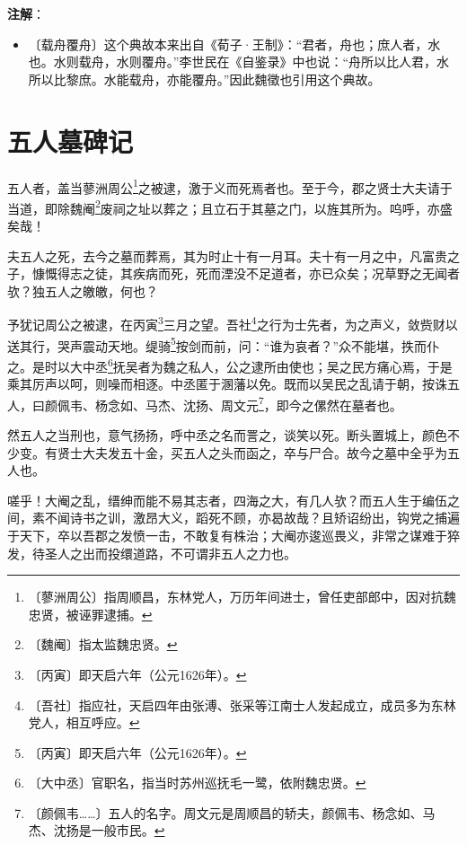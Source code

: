 \documentclass[12pt,UTF-8,openany]{ctexbook}
\begin{document}
\textbf{注解}：

\vspace{-1em}

\begin{itemize}
    \setlength\itemsep{-0.2em}
    \item〔载舟覆舟〕这个典故本来出自《荀子·王制》：“君者，舟也；庶人者，水也。水则载舟，水则覆舟。”李世民在《自鉴录》中也说：“舟所以比人君，水所以比黎庶。水能载舟，亦能覆舟。”因此魏徵也引用这个典故。
\end{itemize}

\chapter{五人墓碑记}

\begin{normalsize}
    
    五人者，盖当蓼洲周公\footnote{〔蓼洲周公〕指周顺昌，东林党人，万历年间进士，曾任吏部郎中，因对抗魏忠贤，被诬罪逮捕。}之被逮，激于义而死焉者也。至于今，郡之贤士大夫请于当道，即除魏阉\footnote{〔魏阉〕指太监魏忠贤。}废祠之址以葬之；且立石于其墓之门，以旌其所为。呜呼，亦盛矣哉！
    
    夫五人之死，去今之墓而葬焉，其为时止十有一月耳。夫十有一月之中，凡富贵之子，慷慨得志之徒，其疾病而死，死而湮没不足道者，亦已众矣；况草野之无闻者欤？独五人之皦皦，何也？
    
    予犹记周公之被逮，在丙寅\footnote{〔丙寅〕即天启六年（公元1626年）。}三月之望。吾社\footnote{〔吾社〕指应社，天启四年由张溥、张采等江南士人发起成立，成员多为东林党人，相互呼应。}之行为士先者，为之声义，敛赀财以送其行，哭声震动天地。缇骑\footnote{〔丙寅〕即天启六年（公元1626年）。}按剑而前，问：“谁为哀者？”众不能堪，抶而仆之。是时以大中丞\footnote{〔大中丞〕官职名，指当时苏州巡抚毛一鹭，依附魏忠贤。}抚吴者为魏之私人，公之逮所由使也；吴之民方痛心焉，于是乘其厉声以呵，则噪而相逐。中丞匿于溷藩以免。既而以吴民之乱请于朝，按诛五人，曰颜佩韦、杨念如、马杰、沈扬、周文元\footnote{〔颜佩韦……〕五人的名字。周文元是周顺昌的轿夫，颜佩韦、杨念如、马杰、沈扬是一般市民。}，即今之傫然在墓者也。
    
    然五人之当刑也，意气扬扬，呼中丞之名而詈之，谈笑以死。断头置城上，颜色不少变。有贤士大夫发五十金，买五人之头而函之，卒与尸合。故今之墓中全乎为五人也。
    
    嗟乎！大阉之乱，缙绅而能不易其志者，四海之大，有几人欤？而五人生于编伍之间，素不闻诗书之训，激昂大义，蹈死不顾，亦曷故哉？且矫诏纷出，钩党之捕遍于天下，卒以吾郡之发愤一击，不敢复有株治；大阉亦逡巡畏义，非常之谋难于猝发，待圣人之出而投缳道路，不可谓非五人之力也。
    

\end{normalsize}
\end{document}
